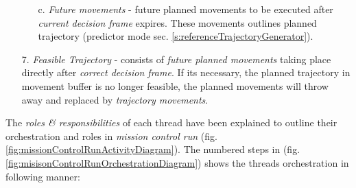 \begin{itemize}
\begin{itemize}
        \item[c.] \emph{Future movements} - future planned movements to be executed after \emph{current decision frame} expires. These movements outlines planned trajectory (predictor mode sec. \ref{s:referenceTrajectoryGenerator}).
    \end{itemize}
    
    \item[7.] \emph{Feasible Trajectory} - consists of \emph{future planned movements} taking place directly after \emph{correct decision frame}. If its necessary, the planned trajectory in movement buffer is no longer feasible, the planned movements will throw away and replaced by \emph{trajectory movements}. 
\end{itemize}

\noindent The \emph{roles \& responsibilities} of each thread have been explained to outline their orchestration and roles in \emph{mission control run} (fig. \ref{fig:missionControlRunActivityDiagram}). The numbered steps in (fig. \ref{fig:misisonControlRunOrchestrationDiagram}) shows the threads orchestration in following manner:


